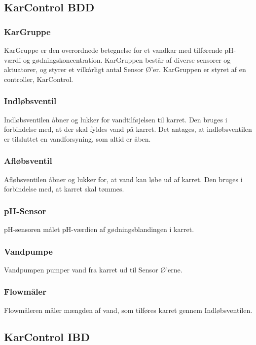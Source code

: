 
\subsection{KarControl BDD}


\subsubsection{KarGruppe}
KarGruppe er den overordnede betegnelse for et vandkar med tilførende pH-værdi og gødningskoncentration. KarGruppen består af diverse sensorer og aktuatorer, og styrer et vilkårligt antal Sensor Ø’er. KarGruppen er styret af en controller, KarControl.

\subsubsection{Indløbsventil}
Indløbsventilen åbner og lukker for vandtilføjelsen til karret. Den bruges i forbindelse med, at der skal fyldes vand på karret. Det antages, at indløbsventilen er tilsluttet en vandforsyning, som altid er åben.

\subsubsection{Afløbsventil}
Afløbsventilen åbner og lukker for, at vand kan løbe ud af karret. Den bruges i forbindelse med, at karret skal tømmes.

\subsubsection{pH-Sensor}
pH-sensoren målet pH-værdien af gødningsblandingen i karret.

\subsubsection{Vandpumpe}
Vandpumpen pumper vand fra karret ud til Sensor Ø’erne.

\subsubsection{Flowmåler}
Flowmåleren måler mængden af vand, som tilføres karret gennem Indløbsventilen.


\subsection{KarControl IBD}

